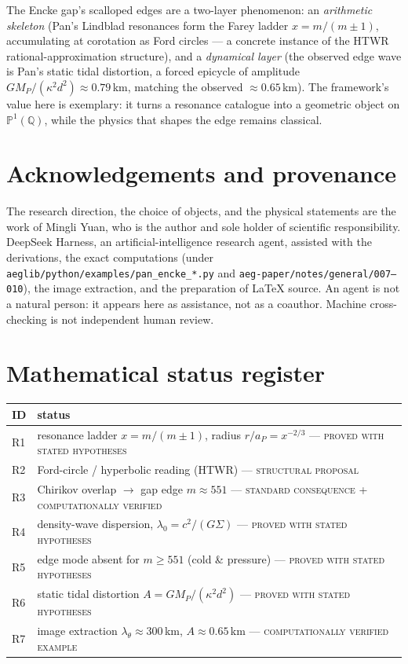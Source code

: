 \documentclass[11pt]{article}
\theoremstyle{remark}
\newcommand{\Q}{\mathbb{Q}}
\newcommand{\PP}{\mathbb{P}}
\begin{document}
The Encke gap's scalloped edges are a two-layer phenomenon: an \emph{arithmetic
skeleton} (Pan's Lindblad resonances form the Farey ladder $x=m/(m\pm1)$,
accumulating at corotation as Ford circles --- a concrete instance of the HTWR
rational-approximation structure), and a \emph{dynamical layer} (the observed
edge wave is Pan's static tidal distortion, a forced epicycle of amplitude
$GM_P/(\kappa^2d^2)\approx0.79$\,km, matching the observed $\approx0.65$\,km).
The framework's value here is exemplary: it turns a resonance catalogue into a
geometric object on $\PP^1(\Q)$, while the physics that shapes the edge remains
classical.

\section*{Acknowledgements and provenance}
The research direction, the choice of objects, and the physical statements are
the work of Mingli Yuan, who is the author and sole holder of scientific
responsibility.  DeepSeek Harness, an artificial-intelligence research agent,
assisted with the derivations, the exact computations (under
\texttt{aeglib/python/examples/pan\_encke\_*.py} and
\texttt{aeg-paper/notes/general/007--010}), the image extraction, and the
preparation of \LaTeX{} source.  An agent is not a natural person: it appears
here as assistance, not as a coauthor.  Machine cross-checking is not
independent human review.

\appendix
\section{Mathematical status register}\label{app:status}
\begin{center}
\begin{tabular}{l p{}}
\toprule
ID & status\\
\midrule
R1 & resonance ladder $x=m/(m\pm1)$, radius $r/a_P=x^{-2/3}$ ---
\textsc{proved with stated hypotheses}\\
R2 & Ford-circle / hyperbolic reading (HTWR) --- \textsc{structural proposal}\\
R3 & Chirikov overlap $\to$ gap edge $m\approx551$ ---
\textsc{standard consequence} + \textsc{computationally verified}\\
R4 & density-wave dispersion, $\lambda_0=c^2/(G\Sigma)$ ---
\textsc{proved with stated hypotheses}\\
R5 & edge mode absent for $m\ge551$ (cold \& pressure) ---
\textsc{proved with stated hypotheses}\\
R6 & static tidal distortion $A=GM_P/(\kappa^2d^2)$ ---
\textsc{proved with stated hypotheses}\\
R7 & image extraction $\lambda_\theta\approx300$\,km, $A\approx0.65$\,km ---
\textsc{computationally verified example}\\
\bottomrule
\end{tabular}
\end{center}

\nocite{Cuzzi1985WavyEdges,GoldreichTremaine1979,PapaloizouLin1988}


\end{document}

